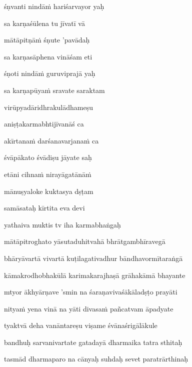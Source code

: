 \ujvers\nemsloka 
śṇvanti nindā\.m hariśarvayor yaḥ
\dontdisplaylinenum

\nemslokab 
sa karṇaśūlena tu jīvatī vā \danda\dontdisplaylinenum

\nemslokac 
mātāpitṇā\.m śṇute 'pavādaḥ
\dontdisplaylinenum

\nemslokad 
sa karṇasāphena vināśam eti \veg\dontdisplaylinenum

\ujvers\nemsloka 
śṇoti nindā\.m guruviprajā yaḥ
\dontdisplaylinenum

\nemslokab 
sa karṇapūya\.m sravate saraktam \danda\dontdisplaylinenum

\nemslokac 
virūpyadāridhrakulādhameṣu
\dontdisplaylinenum

\nemslokad 
aniṣṭakarmabhtijīvanāś ca \veg\dontdisplaylinenum

\ujvers\nemsloka 
akīrtana\.m darśanavarjana\.m ca
\dontdisplaylinenum

\nemslokab 
śvāpākato śvādiṣu jāyate saḥ \danda\dontdisplaylinenum

\nemslokac 
etāni cihna\.m nirayāgatānā\.m
\dontdisplaylinenum

\nemslokad 
mānuṣyaloke kuktasya dṣṭam \veg\dontdisplaylinenum

\nemslokab 
samāsataḥ kīrtita eva devi \danda\dontdisplaylinenum

\nemslokad 
yathaiva muktis tv iha karmabhaṅgaḥ \veg\dontdisplaylinenum

\ujvers\nemsloka 
mātāpitroghato yāsutaduhitvahā bhrātgambhīravegā
\dontdisplaylinenum

\nemslokab 
bhāryāvartā vivartā kuṭilagativadhur bāndhavormītaraṅgā \danda\dontdisplaylinenum

\nemslokac 
kāmakrodhobhakūlā karimakarajhaṣā grāhakāmā bhayante
\dontdisplaylinenum

\nemslokad 
mtyor ākhyārṇave 'smin na śaraṇavivaśākāladṣṭo prayāti \veg\dontdisplaylinenum

\ujvers\nemsloka 
nitya\.m yena vinā na yāti divasa\.m pañcatvam āpadyate
\dontdisplaylinenum

\nemslokab 
tyaktvā deha vanāntareṣu viṣame śvānaśrigālākule \danda\dontdisplaylinenum

\nemslokac 
bandhuḥ sarvanivartate gatadayā dharmaika tatra sthitaḥ
\dontdisplaylinenum

\nemslokad 
tasmād dharmaparo na cānyaḥ suhdaḥ sevet paratrārthinaḥ \veg\dontdisplaylinenum

